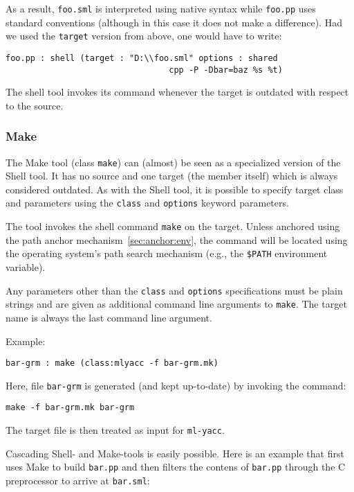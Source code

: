 \noindent As a result, {\tt foo.sml} is interpreted using native
syntax while {\tt foo.pp} uses standard conventions (although in this
case it does not make a difference).  Had we used the {\tt target}
version from above, one would have to write:

\begin{lstlisting}[language=CM]
  foo.pp : shell (target : "D:\\foo.sml" options : shared
                                 cpp -P -Dbar=baz %s %t)
\end{lstlisting}%

The shell tool invokes its command whenever the target is outdated
with respect to the source.

\subsubsection{Make}

The Make tool (class {\tt make}) can (almost) be seen as a specialized
version of the Shell tool.  It has no source and one target (the
member itself) which is always considered outdated.  As with the Shell
tool, it is possible to specify target class and parameters using the
{\tt class} and {\tt options} keyword parameters.

The tool invokes the shell command {\tt make} on the target.  Unless
anchored using the path anchor mechanism~\ref{sec:anchor:env}, the
command will be located using the operating system's path search
mechanism (e.g., the {\tt \$PATH} environment variable).

Any parameters other than the {\tt class} and {\tt options}
specifications must be plain strings and are given as additional
command line arguments to {\tt make}.  The target name is always the
last command line argument.

Example:

\begin{lstlisting}[language=CM]
  bar-grm : make (class:mlyacc -f bar-grm.mk)
\end{lstlisting}%

Here, file {\tt bar-grm} is generated (and kept up-to-date) by
invoking the command:
\begin{lstlisting}[language=CM]
  make -f bar-grm.mk bar-grm
\end{lstlisting}%
\noindent The target file is then treated as input for {\tt ml-yacc}.

Cascading Shell- and Make-tools is easily possible.  Here is an
example that first uses Make to build {\tt bar.pp} and then filters
the contens of {\tt bar.pp} through the C preprocessor to arrive at
{\tt bar.sml}:

